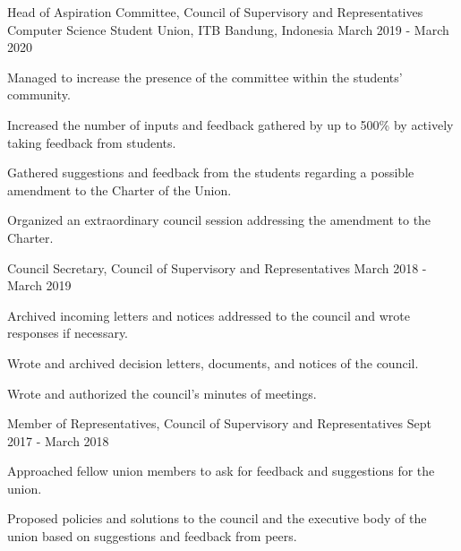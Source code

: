 \begin{cventries}
    \cventry
    {Head of Aspiration Committee, Council of Supervisory and Representatives} %
    {Computer Science Student Union, ITB} %
    {Bandung, Indonesia} %
    {March 2019 - March 2020} %
    {
        \begin{cvitems} %
            \item {Managed to increase the presence of the committee within the students' community.}
            \item {Increased the number of inputs and feedback gathered by up to 500\% by actively taking feedback from students.}
            \item {Gathered suggestions and feedback from the students regarding a possible amendment to the Charter of the Union.}
            \item {Organized an extraordinary council session addressing the amendment to the Charter.}
        \end{cvitems}
    }

  \cventry
	{Council Secretary, Council of Supervisory and Representatives} %
	{} %
	{} %
	{March 2018 - March 2019} %
	{
	  \begin{cvitems} %
	  	\item {Archived incoming letters and notices addressed to the council and wrote responses if necessary.}
	  	\item {Wrote and archived decision letters, documents, and notices of the council.}
	  	\item {Wrote and authorized the council's minutes of meetings.}
	  \end{cvitems}
	}

  \cventry
	{Member of Representatives, Council of Supervisory and Representatives} %
	{} %
	{} %
	{Sept 2017 - March 2018} %
	{
	  \begin{cvitems} %
		\item {Approached fellow union members to ask for feedback and suggestions for the union.}
		\item {Proposed policies and solutions to the council and the executive body of the union based on suggestions and feedback from peers.}
	  \end{cvitems}
	}

\end{cventries}
